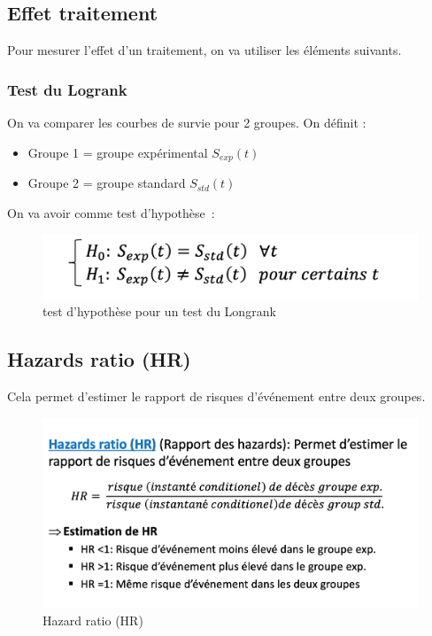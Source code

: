 \subsection{Effet traitement}
Pour mesurer l'effet d'un traitement, on va utiliser les éléments suivants.
\subsubsection{Test du Logrank}
On va comparer les courbes de survie pour 2 groupes.
On définit :
\begin{itemize}
    \item Groupe 1 = groupe expérimental $S_{exp}(t)$
    \item Groupe 2 = groupe standard $S_{std}(t)$
\end{itemize}
On va avoir comme test d'hypothèse :
\begin{figure}[H]
    \centering
    \includegraphics[scale = 0.5]{images/logrank.png}
    \caption{test d'hypothèse pour un test du Longrank}
    \label{fig:my_label}
\end{figure}

\subsection{Hazards ratio (HR)}
Cela permet d'estimer le rapport de risques d'événement entre deux groupes. 
\begin{figure}[H]
    \centering
    \includegraphics[scale=0.5]{images/hazardratio.png}
    \caption{Hazard ratio (HR)}
    \label{fig:my_label}
\end{figure}

